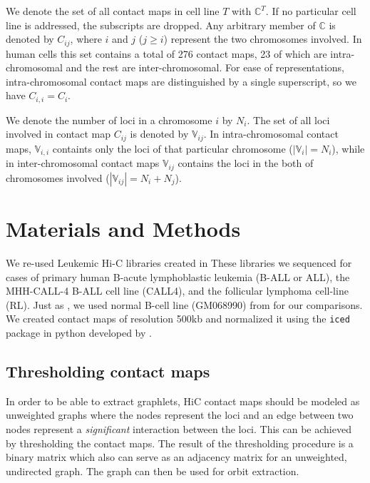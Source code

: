 \documentclass[a4,center,fleqn]{NAR}
\begin{document}
We denote the set of all contact maps in cell line $T$ with 
$\mathbb{C}^T$. If no particular cell line is addressed, the
subscripts are dropped.
Any arbitrary member of $\mathbb{C}$ is denoted by 
$C_{ij}$, where $i$ and $j$ ($j \ge i$) represent the two chromosomes involved. 
In human cells this set contains a total of 276 contact maps,
23 of which are intra-chromosomal and the rest are inter-chromosomal.
For ease of representations, intra-chromosomal contact maps are
distinguished by a single superscript, so we have $C_{i,i} =
C_i$.

We denote the number of loci in a chromosome $i$ by $N_i$.
The set of all loci involved in contact map $C_{ij}$ is denoted 
by $\mathbb{V}_{ij}$.
In intra-chromosomal contact maps, $\mathbb{V}_{i,i}$ containts only the 
loci of that particular chromosome ($|\mathbb{V}_i| = N_i$), while in 
inter-chromosomal contact maps $\mathbb{V}_{ij}$ contains the loci in
the both of chromosomes involved ($|\mathbb{V}_{ij}| = N_i + N_j$).

\enlargethispage{-65.1pt}

\section{Materials and Methods}
We re-used Leukemic Hi-C libraries 
created in \cite{wang2013properties}
These libraries we sequenced 
for cases of primary human B-acute
lymphoblastic leukemia (B-ALL or ALL), 
the MHH-CALL-4 B-ALL cell
line (CALL4), 
and the follicular lymphoma cell-line (RL).
Just as \cite{wang2013properties}, 
we used normal B-cell line (GM068990)
from \cite{lieberman2009comprehensive} 
for our comparisons.
We created contact maps of resolution
500kb and normalized it using 
the \texttt{iced} package in python
developed by \cite{servant2015hic}.



\subsection{Thresholding contact maps}
In order to be able to extract graphlets, HiC contact maps should be modeled as
unweighted graphs where the nodes represent the loci and an edge between two 
nodes represent a \textit{significant} interaction between the loci.
This can be achieved by thresholding the contact maps. The result
of the thresholding procedure is a binary matrix which also can serve as
an adjacency matrix for an unweighted, undirected graph. The graph can then be
used for orbit extraction.
\end{document}
